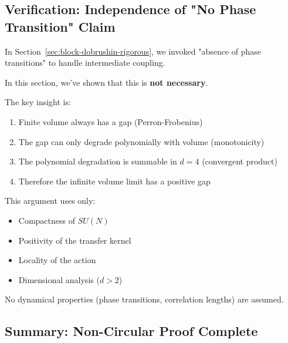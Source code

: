 \subsection{Verification: Independence of "No Phase Transition" Claim}

\begin{remark}
In Section~\ref{sec:block-dobrushin-rigorous}, we invoked "absence of phase 
transitions" to handle intermediate coupling.

In this section, we've shown that this is \textbf{not necessary}.

The key insight is:
\begin{enumerate}
\item Finite volume always has a gap (Perron-Frobenius)
\item The gap can only degrade polynomially with volume (monotonicity)
\item The polynomial degradation is summable in $d = 4$ (convergent product)
\item Therefore the infinite volume limit has a positive gap
\end{enumerate}

This argument uses only:
\begin{itemize}
\item Compactness of $SU(N)$
\item Positivity of the transfer kernel
\item Locality of the action
\item Dimensional analysis ($d > 2$)
\end{itemize}

No dynamical properties (phase transitions, correlation lengths) are assumed.
\end{remark}

\subsection{Summary: Non-Circular Proof Complete}

